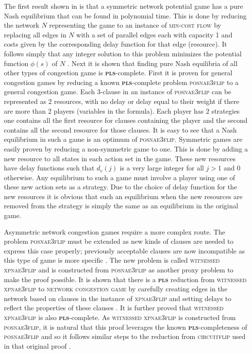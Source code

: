 \documentclass{article}
\begin{document}
\begin{multicols}{2}
\par
The first result shown in \cite{Fabrikant.2004} is that a symmetric network potential game has a pure Nash equilibrium that can be found in polynomial time. This is done by reducing the network $N$ representing the game to an instance of \textsc{min-cost flow} by replacing all edges in $N$ with a set of parallel edges each with capacity 1 and costs given by the corresponding delay function for that edge (resource). It follows simply that any integer solution to this problem minimizes the potential function $\phi(s)$ of $N$ \cite{Fabrikant.2004}. Next it is shown that finding pure Nash equilibria of all other types of congestion game is \textbf{\textsc{pls}}-complete. First it is proven for general congestion games by reducing a known \textbf{\textsc{pls}}-complete problem \textsc{posnae3flip} \cite{local_search_complex} to a general congestion game. Each 3-clause in an instance of \textsc{posnae3flip} can be represented as 2 resources, with no delay or delay equal to their weight if there are more than 2 players (variables in the formula). Each player has 2 strategies one contains all the first resource for clauses containing the player and the second contains all the second resource for those clauses. It is easy to see that a Nash equilibrium in such a game is an optimum of \textsc{posnae3flip}. Symmetric games are easily proven by reducing a non-symmetric game to one. This is done by adding a new resource to all states in each action set in the game. These new resources have delay functions such that $d_e(j)$ is a very large integer for all $j>1$ and $0$ otherwise. Any equilibrium to such a game must involve a player using one of these new action sets as a strategy. Due to the choice of delay function for the new resources it is obvious that such an equilibrium when the new resources are removed from the strategy is simply the same as an equilibrium in the original game.

Asymmetric network congestion games require a more complex route. The problem \textsc{posnae3flip} must be extended as new kinds of clauses are needed to express this case properly; previously acceptable clauses are now incompatible as this type of game is more specific \cite{Fabrikant.2004}. The new problem is called \textsc{witnessed xpnae3flip} and is constructed from \textsc{posnae3flip} as another proxy problem to make the proof possible. It is shown that there is a \textbf{\textsc{pls}} reduction from \textsc{witnessed xpnae3flip} to \textsc{network congestion game} by carefully creating edges in the network based on clauses in the instance of \textsc{xpnae3flip} and setting delays to reflect the properties of these clauses \cite{Fabrikant.2004}. It is further proved that \textsc{witnessed xpnae3flip} is also \textbf{\textsc{pls}}-complete. As \textsc{witnessed xpnae3flip} is constructed from \textsc{posnae3flip}, it is natural that this proof leverages the known \textbf{\textsc{pls}}-completeness of \textsc{posnae3flip} and so it follows similar steps to the reduction from \textsc{circuitflip} used in that original proof \cite{local_search_complex}.


\end{multicols}
\end{document}
